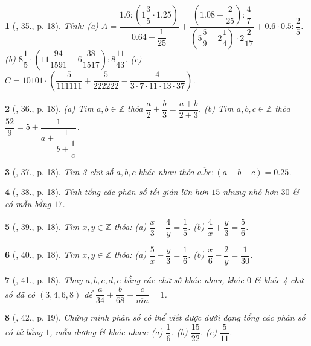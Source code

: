 \documentclass{article}
\newtheorem{baitoan}{}
\begin{document}
\begin{baitoan}[\cite{Binh_Toan_6_tap_2}, 35., p. 18]
	Tính: (a) $A = \dfrac{1.6:\left(1\dfrac{3}{5}\cdot1.25\right)}{0.64 - \dfrac{1}{25}} + \dfrac{\left(1.08 - \dfrac{2}{25}\right):\dfrac{4}{7}}{\left(5\dfrac{5}{9} - 2\dfrac{1}{4}\right)\cdot2\dfrac{2}{17}} + 0.6\cdot0.5:\dfrac{2}{5}$. (b) $8\dfrac{1}{5}\cdot\left(11\dfrac{94}{1591} - 6\dfrac{38}{1517}\right):8\dfrac{11}{43}$. (c) $C = 10101\cdot\left(\dfrac{5}{111111} + \dfrac{5}{222222} - \dfrac{4}{3\cdot7\cdot11\cdot13\cdot37}\right)$.
\end{baitoan}

\begin{baitoan}[\cite{Binh_Toan_6_tap_2}, 36., p. 18]
	(a) Tìm $a,b\in\mathbb{Z}$ thỏa $\dfrac{a}{2} + \dfrac{b}{3} = \dfrac{a + b}{2 + 3}$. (b) Tìm $a,b,c\in\mathbb{Z}$ thỏa $\dfrac{52}{9} = 5 + \dfrac{1}{a + \dfrac{1}{b + \dfrac{1}{c}}}$.
\end{baitoan}

\begin{baitoan}[\cite{Binh_Toan_6_tap_2}, 37., p. 18]
	Tìm 3 chữ số $a,b,c$ khác nhau thỏa $\overline{a.bc}:(a + b + c) = 0.25$.
\end{baitoan}

\begin{baitoan}[\cite{Binh_Toan_6_tap_2}, 38., p. 18]
	Tính tổng các phân số tối giản lớn hơn $15$ nhưng nhỏ hơn $30$ \& có mẫu bằng $17$.
\end{baitoan}

\begin{baitoan}[\cite{Binh_Toan_6_tap_2}, 39., p. 18]
	Tìm $x,y\in\mathbb{Z}$ thỏa: (a) $\dfrac{x}{3} - \dfrac{4}{y} = \dfrac{1}{5}$. (b) $\dfrac{4}{x} + \dfrac{y}{3} = \dfrac{5}{6}$.
\end{baitoan}

\begin{baitoan}[\cite{Binh_Toan_6_tap_2}, 40., p. 18]
	Tìm $x,y\in\mathbb{Z}$ thỏa: (a) $\dfrac{5}{x} - \dfrac{y}{3} = \dfrac{1}{6}$. (b) $\dfrac{x}{6} - \dfrac{2}{y} = \dfrac{1}{30}$.
\end{baitoan}

\begin{baitoan}[\cite{Binh_Toan_6_tap_2}, 41., p. 18]
	Thay $a,b,c,d,e$ bằng các chữ số khác nhau, khác $0$ \& khác 4 chữ số đã có $(3,4,6,8)$ để $\dfrac{a}{34} + \dfrac{b}{68} + \dfrac{c}{\overline{mn}} = 1$.
\end{baitoan}

\begin{baitoan}[\cite{Binh_Toan_6_tap_2}, 42., p. 19]
	Chứng minh phân số có thể viết được dưới dạng tổng các phân số có tử bằng $1$, mẫu dương \& khác nhau: (a) $\dfrac{1}{6}$. (b) $\dfrac{15}{22}$. (c) $\dfrac{5}{11}$.
\end{baitoan}
\end{document}
